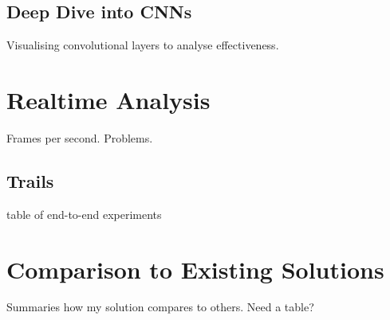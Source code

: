 \subsection{Deep Dive into CNNs}
Visualising convolutional layers to analyse effectiveness.

\section{Realtime Analysis}
Frames per second.  Problems.

\subsection{Trails}
table of end-to-end experiments

\section{Comparison to Existing Solutions}
Summaries how my solution compares to others.  Need a table?
